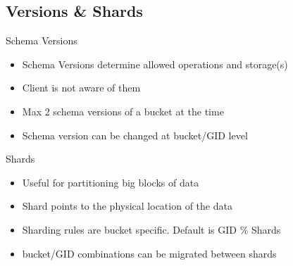 \documentclass[aspectratio=169]{beamer}
\begin{document}
\subsection{Versions \& Shards}

\begin{frame}{Schema Versions}
    \begin{itemize}
        \item Schema Versions determine allowed operations and storage(s)
        \item Client is not aware of them
        \item Max 2 schema versions of a bucket at the time
        \item Schema version can be changed at bucket/GID level
    \end{itemize}
\end{frame}

\begin{frame}{Shards}
    \begin{itemize}
        \item Useful for partitioning big blocks of data
        \item Shard points to the physical location of the data
        \item Sharding rules are bucket specific. Default is GID \% Shards
        \item bucket/GID combinations can be migrated between shards
    \end{itemize}
\end{frame}
\end{document}
